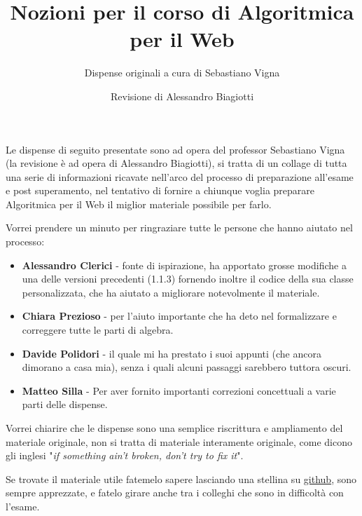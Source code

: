 \documentclass[a4paper]{book-enhanced}
\title{Nozioni per il corso di Algoritmica per il Web}
\subtitle{Dispense originali a cura di Sebastiano Vigna}
\author{Revisione di Alessandro Biagiotti}
\begin{document}
\maketitle
\noindent Le dispense di seguito presentate sono ad opera del professor Sebastiano Vigna (la
revisione è ad opera di Alessandro Biagiotti), si tratta di un collage di tutta una serie di
informazioni ricavate nell'arco del processo di preparazione all'esame e post superamento, nel tentativo di fornire a chiunque voglia preparare Algoritmica per il Web il miglior materiale possibile per farlo.

Vorrei prendere un minuto per ringraziare tutte le persone che hanno aiutato nel processo:
\begin{itemize}
	\item\textbf{Alessandro Clerici} - fonte di ispirazione, ha apportato grosse modifiche a una delle versioni precedenti (1.1.3) fornendo inoltre il codice della sua classe personalizzata, che ha aiutato a migliorare notevolmente il materiale.

	\item\textbf{Chiara Prezioso} - per l'aiuto importante che ha deto nel formalizzare e correggere tutte le parti di algebra.

	\item\textbf{Davide Polidori} - il quale mi ha prestato i suoi appunti (che ancora dimorano a casa mia), senza i quali alcuni passaggi sarebbero tuttora oscuri.

	\item\textbf{Matteo Silla} - Per aver fornito importanti correzioni concettuali a varie parti delle dispense.
\end{itemize}

Vorrei chiarire che le dispense sono una semplice riscrittura e ampliamento del materiale originale, non si tratta di materiale interamente originale, come dicono gli inglesi "\textit{if something ain't broken, don't try to fix it}".

Se trovate il materiale utile fatemelo sapere lasciando una stellina su \href{https://github.com/S3gmentati0nFault/Algoweb}{github}, sono sempre apprezzate, e fatelo girare anche tra i colleghi che sono in difficoltà con l'esame.

\tableofcontents
\clearpage



\end{document}
